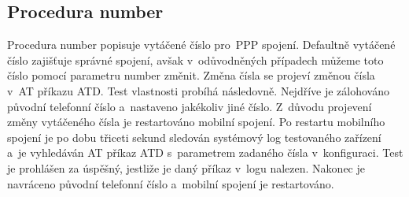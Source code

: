 \subsection{Procedura number}
Procedura number popisuje vytáčené číslo pro~PPP spojení. Defaultně  vytáčené číslo zajišťuje správné spojení, avšak v~odůvodněných případech můžeme toto číslo pomocí parametru number změnit. Změna čísla se projeví změnou čísla v~AT příkazu ATD. Test vlastnosti probíhá následovně. Nejdříve je zálohováno původní telefonní číslo a~nastaveno jakékoliv jiné číslo. Z~důvodu projevení změny vytáčeného čísla je restartováno mobilní spojení. Po restartu mobilního spojení je po dobu třiceti sekund sledován systémový log testovaného zařízení a~je vyhledáván AT příkaz ATD s~parametrem zadaného čísla v~konfiguraci. Test je prohlášen za úspěšný, jestliže je daný příkaz v~logu nalezen. Nakonec je navráceno původní telefonní číslo a~mobilní spojení je restartováno.

\endinput
